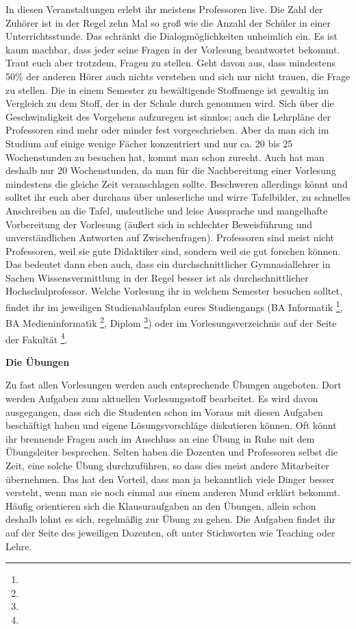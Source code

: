 In diesen Veranstaltungen erlebt ihr meistens Professoren live. Die Zahl der Zuhörer ist in der Regel zehn Mal so groß wie die Anzahl der Schüler in einer Unterrichtsstunde. Das schränkt die Dialogmöglichkeiten unheimlich ein. Es ist kaum machbar, dass jeder seine Fragen in der Vorlesung beantwortet bekommt. Traut euch aber trotzdem, Fragen zu stellen. Geht davon aus, dass mindestens 50\% der anderen Hörer auch nichts verstehen und sich nur nicht trauen, die Frage zu stellen. Die in einem Semester zu bewältigende Stoffmenge ist gewaltig im Vergleich zu dem Stoff, der in der Schule durch genommen wird. Sich über die Geschwindigkeit des Vorgehens aufzuregen ist sinnlos; auch die Lehrpläne der Professoren sind mehr oder minder fest vorgeschrieben. Aber da man sich im Studium auf einige wenige Fächer konzentriert und nur ca. 20 bis 25 Wochenstunden zu besuchen hat, kommt man schon zurecht. Auch hat man deshalb nur 20 Wochenstunden, da man für die Nachbereitung einer Vorlesung mindestens die gleiche Zeit veranschlagen sollte. Beschweren allerdings könnt und solltet ihr euch aber durchaus über unleserliche und wirre Tafelbilder, zu schnelles Anschreiben an die Tafel, undeutliche und leise Aussprache und mangelhafte Vorbereitung der Vorlesung (äußert sich in schlechter Beweisführung und unverständlichen Antworten auf Zwischenfragen). Professoren sind meist nicht Professoren, weil sie gute Didaktiker sind, sondern weil sie gut forschen können. Das bedeutet dann eben auch, dass ein durchschnittlicher Gymnasiallehrer in Sachen Wissensvermittlung in der Regel besser ist als durchschnittlicher Hochschulprofessor. Welche Vorlesung ihr in welchem Semester besuchen solltet, findet ihr im jeweiligen Studienablaufplan eures Studiengangs (BA Informatik \footnote{}, BA Medieninformatik \footnote{}, Diplom \footnote{}) oder im Vorlesungsverzeichnis auf der Seite der Fakultät \footnote{}.

\textbf{Die Übungen}

Zu fast allen Vorlesungen werden auch entsprechende Übungen angeboten. Dort werden Aufgaben zum aktuellen Vorlesungsstoff bearbeitet. Es wird davon ausgegangen, dass sich die Studenten schon im Voraus mit diesen Aufgaben beschäftigt haben und eigene Lösungsvorschläge diskutieren können. Oft könnt ihr brennende Fragen auch im Anschluss an eine Übung in Ruhe mit dem Übungsleiter besprechen. Selten haben die Dozenten und Professoren selbst die Zeit, eine solche Übung durchzuführen, so dass dies meist andere Mitarbeiter übernehmen. Das hat den Vorteil, dass man ja bekanntlich viele Dinger besser versteht, wenn man sie noch einmal aus einem anderen Mund erklärt bekommt. Häufig orientieren sich die Klausuraufgaben an den Übungen, allein schon deshalb lohnt es sich, regelmäßig zur Übung zu gehen. Die Aufgaben findet ihr auf der Seite des jeweiligen Dozenten, oft unter Stichworten wie Teaching oder Lehre.

